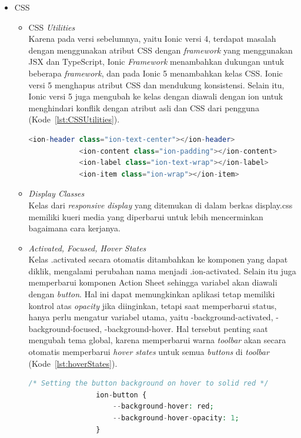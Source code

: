 \begin{enumerate}
	\begin{itemize}
		\item CSS
		\begin{itemize}
			\item CSS {\it Utilities} \\
			Karena pada versi sebelumnya, yaitu Ionic versi 4, terdapat masalah dengan menggunakan atribut CSS dengan {\it framework} yang menggunakan JSX dan TypeScript, Ionic {\it Framework} menambahkan dukungan untuk beberapa {\it framework}, dan pada Ionic 5 menambahkan kelas CSS. Ionic versi 5 menghapus atribut CSS dan mendukung konsistensi. Selain itu, Ionic versi 5 juga mengubah ke kelas dengan diawali dengan ion untuk menghindari konflik dengan atribut asli dan CSS dari pengguna (Kode~\ref{lst:CSSUtilities}).
		\begin{lstlisting}[language=php, label={lst:CSSUtilities}, caption=Contoh Kode Kelas CSS {\it Utility} pada Ionic 5]
			<ion-header class="ion-text-center"></ion-header>
			<ion-content class="ion-padding"></ion-content>
			<ion-label class="ion-text-wrap"></ion-label>
			<ion-item class="ion-wrap"></ion-item>
		\end{lstlisting} 
  
			\item {\it Display Classes} \\ 
			Kelas dari {\it responsive display} yang ditemukan di dalam berkas display.css memiliki kueri media yang diperbarui untuk lebih mencerminkan bagaimana cara kerjanya.

			\item {\it Activated, Focused, Hover States} \\
			Kelas .activated secara otomatis ditambahkan ke komponen yang dapat diklik, mengalami perubahan nama menjadi .ion-activated. Selain itu juga memperbarui komponen Action Sheet sehingga variabel akan diawali dengan {\it button}. Hal ini dapat memungkinkan aplikasi tetap memiliki kontrol atas {\it opacity} jika diinginkan, tetapi saat memperbarui status, hanya perlu mengatur variabel utama, yaitu -background-activated, -background-focused, -background-hover. Hal tersebut penting saat mengubah tema global, karena memperbarui warna {\it toolbar} akan secara otomatis memperbarui {\it hover states} untuk semua {\it buttons} di {\it toolbar} (Kode~\ref{lst:hoverStates}). 
		\begin{lstlisting}[language=php, label={lst:hoverStates}, caption=Contoh Kode {\it Hover States} pada Ionic 5]
			/* Setting the button background on hover to solid red */
				ion-button {
					--background-hover: red;
					--background-hover-opacity: 1;
				}


\end{lstlisting}
\end{itemize}
\end{itemize}
\end{enumerate}
